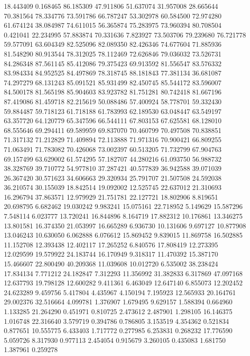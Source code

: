 18.443409
0.168465
86.185309
47.911806
51.637074
31.957008
28.665644
70.381564
78.334776
73.591786
66.787247
53.302978
60.584500
72.974280
61.674124
38.084987
74.611015
56.365874
75.283975
73.960394
80.708504
0.421041
22.234995
57.883874
70.331636
7.823927
73.503706
79.239680
76.721778
59.577091
63.604349
82.525096
82.089350
82.426346
74.677604
71.885936
81.548290
80.913544
78.312025
78.112469
72.626846
79.036032
73.526731
84.286348
87.561145
85.412086
79.375423
69.913592
81.556547
83.576332
83.984334
84.952525
84.497869
78.318745
88.181843
77.381134
36.681087
74.297279
68.131243
85.091521
85.931499
82.450745
85.544172
83.596007
84.500178
81.565198
85.904603
83.923782
81.751281
80.742418
81.667196
87.419086
81.459718
82.215619
50.088486
57.400924
58.778701
59.332430
59.884487
59.718123
61.718188
61.783993
62.189530
63.048447
63.549197
63.357720
64.120779
65.347596
66.544111
67.803153
67.625581
68.128010
68.555646
69.294411
69.589959
69.837070
70.460799
70.497508
70.838851
71.317132
71.212829
71.409894
72.113888
71.971316
70.900421
66.809255
71.063491
71.783082
70.426068
73.002397
60.513205
71.732799
67.904763
69.157499
63.629002
61.574295
57.182707
44.280216
61.093750
56.988732
38.328769
39.710772
54.977810
37.287421
40.577839
36.942588
39.071039
26.367420
30.571623
34.606663
29.320934
25.791707
21.507508
24.592038
36.210574
30.155039
18.842514
19.092002
12.525745
22.637012
21.310693
16.296794
37.863571
12.979929
21.751781
22.127721
18.802906
8.819651
20.698795
6.682462
19.030242
9.983241
15.075161
22.718952
5.149629
15.587296
7.548114
6.023777
13.720241
16.844896
8.164719
17.882312
10.176861
13.346275
13.801581
16.374350
21.053997
16.665289
6.936730
10.131606
9.697127
10.877908
13.046243
10.630050
6.062888
6.076612
15.869452
9.839015
11.869758
16.502885
11.152708
12.393438
12.402117
17.265252
6.840576
17.808419
12.273395
12.029599
19.579922
24.183744
16.170949
9.318317
11.470392
15.387170
15.466607
22.800490
40.209368
11.039608
10.012720
6.535002
38.238424
17.834134
7.771212
24.182847
7.312293
11.356992
31.382833
6.317869
47.097168
12.637793
19.798128
12.600282
9.411361
6.463049
12.647140
6.855073
12.202452
24.623289
9.459756
5.417804
4.435967
4.150194
7.195923
12.565933
20.164761
29.002376
32.516664
4.099781
1.376907
1.679495
9.629157
1.588394
0.664960
1.133285
21.264290
0.451971
0.810725
2.473612
2.487901
1.298105
16.146375
1.016748
22.316640
3.579719
0.394786
0.786805
3.153519
4.354362
0.521834
0.877651
10.555775
6.433403
1.717772
0.277985
6.253831
0.268232
17.776590
5.059726
8.317930
0.977113
2.454054
0.915679
3.260105
0.435083
1.681750
1.387961
0.259278
